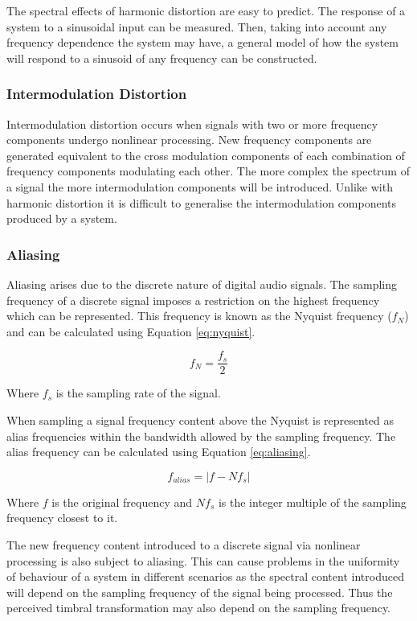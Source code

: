 			The spectral effects of harmonic distortion are easy to predict. The response of a system to a
			sinusoidal input can be measured. Then, taking into account any frequency dependence the system may
			have, a general model of how the system will respond to a sinusoid of any frequency can be
			constructed.

		\subsubsection*{Intermodulation Distortion}
			Intermodulation distortion occurs when signals with two or more frequency components undergo
			nonlinear processing. New frequency components are generated equivalent to the cross modulation
			components of each combination of frequency components modulating each other. The more complex the
			spectrum of a signal the more intermodulation components will be introduced. Unlike with harmonic
			distortion it is difficult to generalise the intermodulation components produced by a system. 

		\subsubsection*{Aliasing}
			Aliasing arises due to the discrete nature of digital audio signals. The sampling frequency of a
			discrete signal imposes a restriction on the highest frequency which can be represented. This
			frequency is known as the Nyquist frequency ($f_{N}$) and can be calculated using Equation
			\ref{eq:nyquist}.

			\begin{equation}
				f_{N} = \frac{f_{s}}{2}
				\label{eq:nyquist}
			\end{equation}

			Where $f_{s}$ is the sampling rate of the signal.

			When sampling a signal frequency content above the Nyquist is represented as alias frequencies
			within the bandwidth allowed by the sampling frequency. The alias frequency can be calculated using
			Equation \ref{eq:aliasing}.

			\begin{equation}
				f_{alias} = |f - Nf_{s}|
				\label{eq:aliasing}
			\end{equation}

			Where $f$ is the original frequency and $Nf_{s}$ is the integer multiple of the sampling
			frequency closest to it.

			The new frequency content introduced to a discrete signal via nonlinear processing is also subject
			to aliasing. This can cause problems in the uniformity of behaviour of a system in different
			scenarios as the spectral content introduced will depend on the sampling frequency of the signal
			being processed. Thus the perceived timbral transformation may also depend on the sampling
			frequency.

